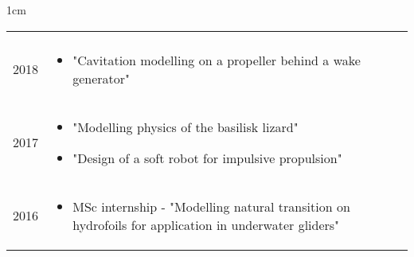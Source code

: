 \documentclass[a4paper,10pt]{article}
\begin{document}
\begin{minipage}{\textwidth}
\begin{adjustwidth}{}{1cm}
{\begin{tabular}{l p{15.0cm}}
\begin{itemize}
    \end{itemize}\vspace{-13pt} \\
%
\textsc{2018} & \vspace{-13pt}\begin{itemize}
    \item "Cavitation modelling on a propeller behind a wake generator"
    \end{itemize}\vspace{-13pt} \\
%
\textsc{2017} & \vspace{-13pt}\begin{itemize}
    \item "Modelling physics of the basilisk lizard"
    \item "Design of a soft robot for impulsive propulsion"
    \end{itemize}\vspace{-13pt} \\
%
\textsc{2016} & \vspace{-13pt}\begin{itemize}
    \item MSc internship - "Modelling natural transition on hydrofoils for application in underwater gliders"
    \end{itemize}\vspace{-13pt} \\
%
\end{tabular}
}

\end{adjustwidth}
\end{minipage}

\end{document}
